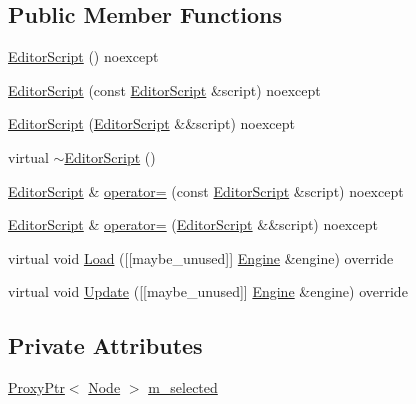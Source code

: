\subsection*{Public Member Functions}
\begin{DoxyCompactItemize}
\item 
\hyperlink{classmage_1_1script_1_1_editor_script_a6a16b52ab1952669a597abab1d66a73d}{Editor\+Script} () noexcept
\item 
\hyperlink{classmage_1_1script_1_1_editor_script_adfe05bb0529f098c404c25326ef0fd2e}{Editor\+Script} (const \hyperlink{classmage_1_1script_1_1_editor_script}{Editor\+Script} \&script) noexcept
\item 
\hyperlink{classmage_1_1script_1_1_editor_script_ac7db9f4ad73fc58c371aaf754009404e}{Editor\+Script} (\hyperlink{classmage_1_1script_1_1_editor_script}{Editor\+Script} \&\&script) noexcept
\item 
virtual \hyperlink{classmage_1_1script_1_1_editor_script_a1454bd68e4111691b6e287966dfd252a}{$\sim$\+Editor\+Script} ()
\item 
\hyperlink{classmage_1_1script_1_1_editor_script}{Editor\+Script} \& \hyperlink{classmage_1_1script_1_1_editor_script_ab7b4dda8389d07d41eba1474491b4a36}{operator=} (const \hyperlink{classmage_1_1script_1_1_editor_script}{Editor\+Script} \&script) noexcept
\item 
\hyperlink{classmage_1_1script_1_1_editor_script}{Editor\+Script} \& \hyperlink{classmage_1_1script_1_1_editor_script_a87df2b20fee97f6aa9e09b4b5c9282a5}{operator=} (\hyperlink{classmage_1_1script_1_1_editor_script}{Editor\+Script} \&\&script) noexcept
\item 
virtual void \hyperlink{classmage_1_1script_1_1_editor_script_af0804c603852f556d362f43e69240b2d}{Load} (\mbox{[}\mbox{[}maybe\+\_\+unused\mbox{]}\mbox{]} \hyperlink{classmage_1_1_engine}{Engine} \&engine) override
\item 
virtual void \hyperlink{classmage_1_1script_1_1_editor_script_a311532d499edfaf3f74aa598fb87ec8e}{Update} (\mbox{[}\mbox{[}maybe\+\_\+unused\mbox{]}\mbox{]} \hyperlink{classmage_1_1_engine}{Engine} \&engine) override
\end{DoxyCompactItemize}
\subsection*{Private Attributes}
\begin{DoxyCompactItemize}
\item 
\hyperlink{classmage_1_1_proxy_ptr}{Proxy\+Ptr}$<$ \hyperlink{classmage_1_1_node}{Node} $>$ \hyperlink{classmage_1_1script_1_1_editor_script_a60a8044379dfd203ad372dabb5c03380}{m\+\_\+selected}
\end{DoxyCompactItemize}

